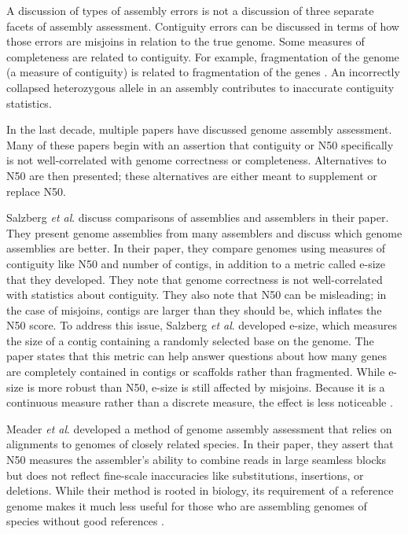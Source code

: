 \documentclass[twocolumn, dvipsnames]{bmcart}%
\begin{document}
A discussion of types of assembly errors is not a discussion of three separate facets of assembly assessment. Contiguity errors can be discussed in terms of how those errors are misjoins in relation to the true genome. Some measures of completeness are related to contiguity. For example, fragmentation of the genome (a measure of contiguity) is related to fragmentation of the genes \cite{grau_improving_2018}. An incorrectly collapsed heterozygous allele in an assembly contributes to inaccurate contiguity statistics.

In the last decade, multiple papers have discussed genome assembly assessment. Many of these papers begin with an assertion that contiguity or N50 specifically is not well-correlated with genome correctness or completeness. Alternatives to N50 are then presented; these alternatives are either meant to supplement or replace N50.

Salzberg \textit{et al}. discuss comparisons of assemblies and assemblers in their paper. They present genome assemblies from many assemblers and discuss which genome assemblies are better. In their paper, they compare genomes using measures of contiguity like N50 and number of contigs, in addition to a metric called e-size that they developed. They note that genome correctness is not well-correlated with statistics about contiguity. They also note that N50 can be misleading; in the case of misjoins, contigs are larger than they should be, which inflates the N50 score. To address this issue, Salzberg \textit{et al}. developed e-size, which measures the size of a contig containing a randomly selected base on the genome. The paper states that this metric can help answer questions about how many genes are completely contained in contigs or scaffolds rather than fragmented. While e-size is more robust than N50, e-size is still affected by misjoins. Because it is a continuous measure rather than a discrete measure, the effect is less noticeable \cite{Salzberg2012}.

Meader \textit{et al}. developed a method of genome assembly assessment that relies on alignments to genomes of closely related species. In their paper, they assert that N50 measures the assembler's ability to combine reads in large seamless blocks but does not reflect fine-scale inaccuracies like substitutions, insertions, or deletions. While their method is rooted in biology, its requirement of a reference genome makes it much less useful for those who are assembling genomes of species without good references \cite{Meader2010}.
\end{document}
